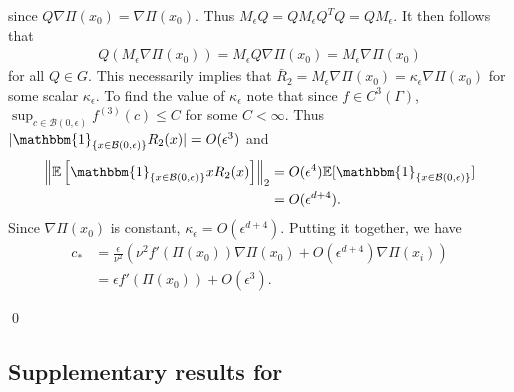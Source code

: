 \documentclass[11pt]{article}
\begin{document}
since $Q\nabla\Pi(x_0) = \nabla\Pi(x_0)$. Thus $M_{\epsilon}Q = QM_{\epsilon}Q^TQ = QM_{\epsilon}$. It then follows that
\begin{align*}
    Q(M_{\epsilon}\nabla\Pi(x_0)) = M_{\epsilon}Q\nabla\Pi(x_0) = M_{\epsilon}\nabla\Pi(x_0)
\end{align*}
for all $Q \in G$. This necessarily implies that $\bar{R}_2 = M_{\epsilon}\nabla\Pi(x_0) = \kappa_{\epsilon}\nabla\Pi(x_0)$ for some scalar $\kappa_{\epsilon}$. To find the value of $\kappa_{\epsilon}$ note that since $f\in C^3(\Gamma)$, $\sup_{c \in \mathcal{B}(0, \epsilon)}f^{(3)}(c) \leq C$ for some $C < \infty$. Thus $|\mathbbm{1}_{\{x \in \mathcal{B}(0, \epsilon)\}}R_2(x)| = O(\epsilon^3)$ and 
\begin{align*}
    \left\|\mathbb{E}\left[\mathbbm{1}_{\{x \in \mathcal{B}(0, \epsilon)\}}xR_2(x)\right]\right\|_2 &= O(\epsilon^4) \mathbb{E}[\mathbbm{1}_{\{x \in \mathcal{B}(0, \epsilon)\}}] \\
    &= O(\epsilon^{d+4}).
\end{align*}
Since $\nabla\Pi(x_0)$ is constant, $\kappa_{\epsilon} = O(\epsilon^{d+4})$. Putting it together, we have
\begin{align*}
    c_* &= \frac{\epsilon}{\nu^2}\left(\nu^2f'(\Pi(x_0))\nabla\Pi(x_0) + O(\epsilon^{d+4})\nabla\Pi(x_i)\right) \\
    &= \epsilon f'(\Pi(x_0))+ O(\epsilon^3).
\end{align*}

\qed{}

\subsection{Supplementary results for }
\end{document}
